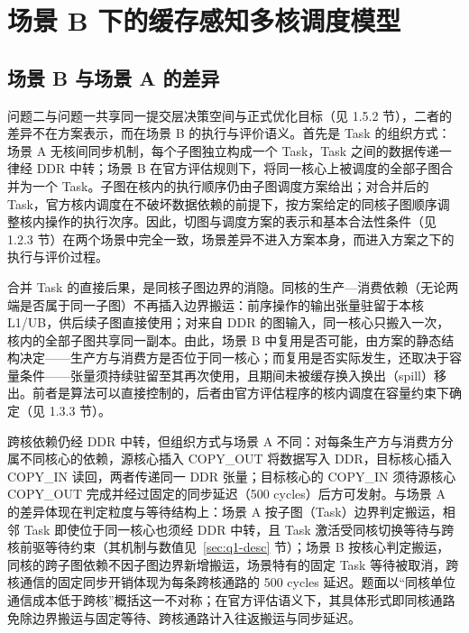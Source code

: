 \section{场景 B 下的缓存感知多核调度模型}\label{sec:q2}

\subsection{场景 B 与场景 A 的差异}
问题二与问题一共享同一提交层决策空间与正式优化目标（见 1.5.2 节），二者的差异不在方案表示，而在场景 B 的执行与评价语义。首先是 Task 的组织方式：场景 A 无核间同步机制，每个子图独立构成一个 Task，Task 之间的数据传递一律经 DDR 中转；场景 B 在官方评估规则下，将同一核心上被调度的全部子图合并为一个 Task。子图在核内的执行顺序仍由子图调度方案给出；对合并后的 Task，官方核内调度在不破坏数据依赖的前提下，按方案给定的同核子图顺序调整核内操作的执行次序。因此，切图与调度方案的表示和基本合法性条件（见 1.2.3 节）在两个场景中完全一致，场景差异不进入方案本身，而进入方案之下的执行与评价过程。

合并 Task 的直接后果，是同核子图边界的消隐。同核的生产—消费依赖（无论两端是否属于同一子图）不再插入边界搬运：前序操作的输出张量驻留于本核 L1/UB，供后续子图直接使用；对来自 DDR 的图输入，同一核心只搬入一次，核内的全部子图共享同一副本。由此，场景 B 中复用是否可能，由方案的静态结构决定——生产方与消费方是否位于同一核心；而复用是否实际发生，还取决于容量条件——张量须持续驻留至其再次使用，且期间未被缓存换入换出（spill）移出。前者是算法可以直接控制的，后者由官方评估程序的核内调度在容量约束下确定（见 1.3.3 节）。

跨核依赖仍经 DDR 中转，但组织方式与场景 A 不同：对每条生产方与消费方分属不同核心的依赖，源核心插入 COPY\_OUT 将数据写入 DDR，目标核心插入 COPY\_IN 读回，两者传递同一 DDR 张量；目标核心的 COPY\_IN 须待源核心 COPY\_OUT 完成并经过固定的同步延迟（500 cycles）后方可发射。与场景 A 的差异体现在判定粒度与等待结构上：场景 A 按子图（Task）边界判定搬运，相邻 Task 即使位于同一核心也须经 DDR 中转，且 Task 激活受同核切换等待与跨核前驱等待约束（其机制与数值见~\ref{sec:q1-desc} 节）；场景 B 按核心判定搬运，同核的跨子图依赖不因子图边界新增搬运，场景特有的固定 Task 等待被取消，跨核通信的固定同步开销体现为每条跨核通路的 500 cycles 延迟。题面以“同核单位通信成本低于跨核”概括这一不对称；在官方评估语义下，其具体形式即同核通路免除边界搬运与固定等待、跨核通路计入往返搬运与同步延迟。

